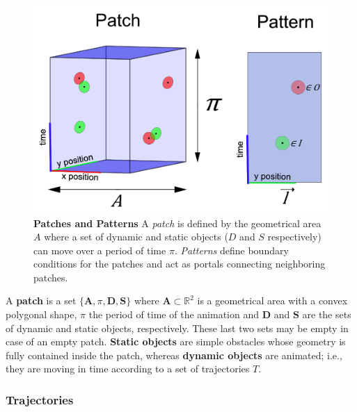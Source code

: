 \begin{figure}[th]
	\begin{center}
	\includegraphics[width=0.9\linewidth]{./images/patch-definitions-arrows.png}
	\caption{
		\textbf{Patches and Patterns}
		A \emph{patch} is defined by the geometrical area $A$ where a set of dynamic and static objects ($D$ and $S$ respectively) can move over a period of time $\pi$.
		\emph{Patterns} define boundary conditions for the patches and act as portals connecting neighboring patches. 
	}
	\label{fig:definitions}
	\end{center}
\end{figure}


A \textbf{patch} is a set $\{\mathbf{A}, \pi, \mathbf{D}, \mathbf{S}\}$ where $\mathbf{A} \subset \mathbb{R}^2$ is a geometrical area with a convex polygonal shape, $\pi$ the period of time of the animation and $\mathbf{D}$ and $\mathbf{S}$ are the sets of dynamic and static objects, respectively. 
These last two sets may be empty in case of an empty patch.
\textbf{Static objects} are simple obstacles whose geometry is fully contained inside the patch, whereas
\textbf{dynamic objects} are animated; i.e., they are moving in time according to a set of trajectories $T$.

\subsubsection{Trajectories}

